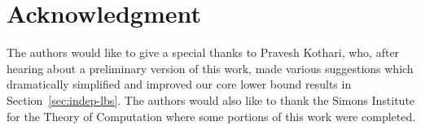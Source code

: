 \documentclass[11pt]{article}
\newcommand{\todo}[1]{\textcolor{red}{TODO: #1}}
\begin{document}
\section*{Acknowledgment}
The authors would like to give a special thanks to Pravesh Kothari, who, after hearing about a preliminary version of this work, made various suggestions which dramatically simplified and improved our core lower bound results in Section~\ref{sec:indep-lbs}. The authors would also like to thank the Simons Institute for the Theory of Computation where some portions of this work were completed.




\appendix
\end{document}
